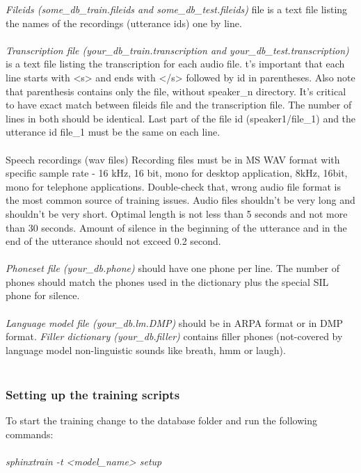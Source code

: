 \documentclass[12pt,a4paper,oneside]{memoir}
\begin{document}
\textit{Fileids (some\_db\_train.fileids and some\_db\_test.fileids)} file is a text file listing the names of the recordings (utterance ids) one by line.
\\\\
\textit{Transcription file (your\_db\_train.transcription and your\_db\_test.transcription)} is a text file listing the transcription for each audio file. t's important that each line starts with <s> and ends with </s> followed by id in parentheses. Also note that parenthesis contains only the file, without speaker\_n directory. It's critical to have exact match between fileids file and the transcription file. The number of lines in both should be identical. Last part of the file id (speaker1/file\_1) and the utterance id file\_1 must be the same on each line.\\\\
Speech recordings (wav files) Recording files must be in MS WAV format with specific sample rate - 16 kHz, 16 bit, mono for desktop application, 8kHz, 16bit, mono for telephone applications. Double-check that, wrong audio file format is the most common source of training issues. Audio files shouldn't be very long and shouldn't be very short. Optimal length is not less than 5 seconds and not more than 30 seconds. Amount of silence in the beginning of the utterance and in the end of the utterance should not exceed 0.2 second. \\\\
\textit{Phoneset file (your\_db.phone)} should have one phone per line. The number of phones should match the phones used in the dictionary plus the special SIL phone for silence.\\\\
\textit{Language model file (your\_db.lm.DMP)} should be in ARPA format or in DMP format. 
\textit{Filler dictionary (your\_db.filler)} contains filler phones (not-covered by language model non-linguistic sounds like breath, hmm or laugh).\\\\
\subsubsection{Setting up the training scripts}
To start the training change to the database folder and run the following commands:\\\\
\textit{sphinxtrain -t <model\_name> setup}\\\\
\end{document}
